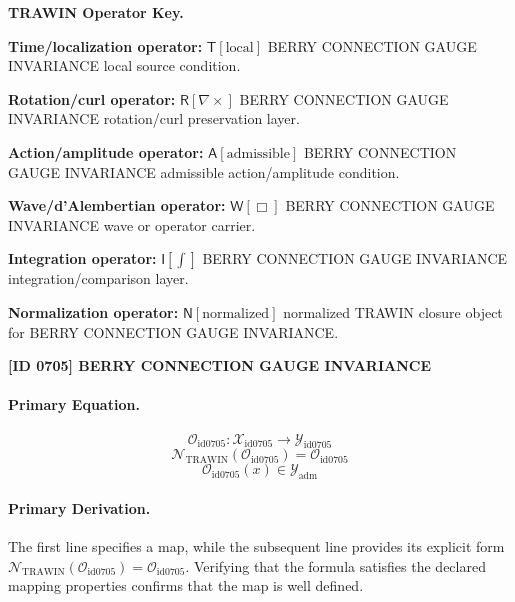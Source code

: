 \par\vspace{0.45\baselineskip}
\noindent\begin{minipage}[t]{\linewidth}
\begingroup
\small
\raggedright
\textbf{TRAWIN Operator Key.}\par
\noindent\textbf{Time/localization operator:} $\mathsf{T}\!\left[\mathrm{local}\right]$ BERRY CONNECTION GAUGE INVARIANCE local source condition.\par
\noindent\textbf{Rotation/curl operator:} $\mathsf{R}\!\left[\nabla\times\right]$ BERRY CONNECTION GAUGE INVARIANCE rotation/curl preservation layer.\par
\noindent\textbf{Action/amplitude operator:} $\mathsf{A}\!\left[\mathrm{admissible}\right]$ BERRY CONNECTION GAUGE INVARIANCE admissible action/amplitude condition.\par
\noindent\textbf{Wave/d'Alembertian operator:} $\mathsf{W}\!\left[\Box\right]$ BERRY CONNECTION GAUGE INVARIANCE wave or operator carrier.\par
\noindent\textbf{Integration operator:} $\mathsf{I}\!\left[\int\right]$ BERRY CONNECTION GAUGE INVARIANCE integration/comparison layer.\par
\noindent\textbf{Normalization operator:} $\mathsf{N}\!\left[\mathrm{normalized}\right]$ normalized TRAWIN closure object for BERRY CONNECTION GAUGE INVARIANCE.\par
\endgroup
\end{minipage}

\clearpage
\noindent\textbf{[ID 0705] BERRY CONNECTION GAUGE INVARIANCE}\par
\vspace{0.35em}
\paragraph{Primary Equation.}
\[
\mathcal{O}_{\mathrm{id0705}}:\mathcal{X}_{\mathrm{id0705}}\longrightarrow\mathcal{Y}_{\mathrm{id0705}}
\]
\[
\mathcal{N}_{\mathrm{TRAWIN}}(\mathcal{O}_{\mathrm{id0705}})=\mathcal{O}_{\mathrm{id0705}}
\]
\[
\mathcal{O}_{\mathrm{id0705}}(x)\in\mathcal{Y}_{\mathrm{adm}}
\]

\paragraph{Primary Derivation.}
The first line specifies a map, while the subsequent line provides its explicit form \( \mathcal{N}_{\mathrm{TRAWIN}}(\mathcal{O}_{\mathrm{id0705}})=\mathcal{O}_{\mathrm{id0705}} \). Verifying that the formula satisfies the declared mapping properties confirms that the map is well defined.

